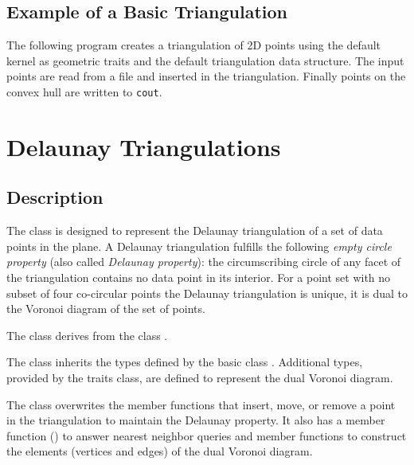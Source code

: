 \subsection{Example of a Basic Triangulation\label{Subsection_2D_Triangulations_Basic_Example}}

The following program  creates a  triangulation of 2D points
using the  default kernel 
as geometric traits and the default triangulation data structure.
 The input points are read from a file 
and inserted in the triangulation.
Finally points on the convex hull are written to {\tt cout}. 


\section{Delaunay Triangulations\label{Section_2D_Triangulations_Delaunay}}

\subsection{Description\label{Subsection_2D_Triangulations_Delaunay_Description}}
The class  is designed to represent
the Delaunay triangulation of a set of data points in the plane.
A  Delaunay triangulation
fulfills
the following {\em empty circle property} 
(also called {\em Delaunay property}): the circumscribing
circle of any facet of the triangulation 
contains no data point in its interior.
For a point set with no subset of four co-circular points
the Delaunay triangulation is unique, it is  dual
to the Voronoi diagram of the set of points.

The class  derives
from the class .

The class 
inherits the types defined by the 
basic class .
Additional types, provided by the traits class,
are defined to represent the dual Voronoi diagram.


The class 
overwrites the member functions that insert, move, or remove a point
in the triangulation to maintain the Delaunay property.
It also has a member function ()
to answer nearest neighbor queries
and member functions to construct the elements (vertices and edges)
of the dual Voronoi diagram.

